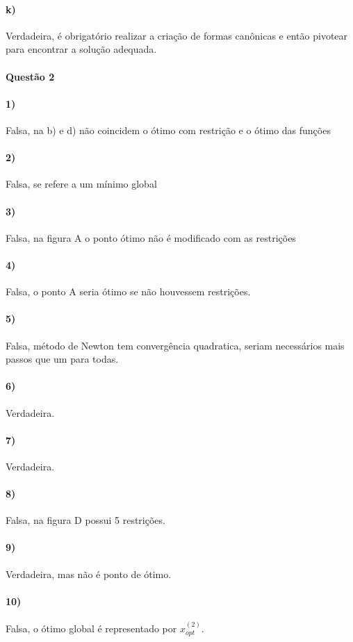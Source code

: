 \documentclass[]{article} %
\begin{document}
\paragraph{k)} Verdadeira, é obrigatório realizar a criação de formas canônicas e então
pivotear para encontrar a solução adequada.

\paragraph{Questão 2}

\paragraph{1)} Falsa, na b) e d) não coincidem o ótimo com restrição e o ótimo das funções
\paragraph{2)} Falsa, se refere a um mínimo global
\paragraph{3)} Falsa, na figura A o ponto ótimo não é modificado com as restrições
\paragraph{4)} Falsa, o ponto A seria ótimo se não houvessem restrições.
\paragraph{5)} Falsa, método de Newton tem convergência quadratica, seriam necessários
mais passos que um para todas.
\paragraph{6)} Verdadeira.
\paragraph{7)} Verdadeira.
\paragraph{8)} Falsa, na figura D possui 5 restrições.
\paragraph{9)} Verdadeira, mas não é ponto de ótimo.
\paragraph{10)} Falsa, o ótimo global é representado por \(x_{opt}^{(2)}\).
\end{document}
